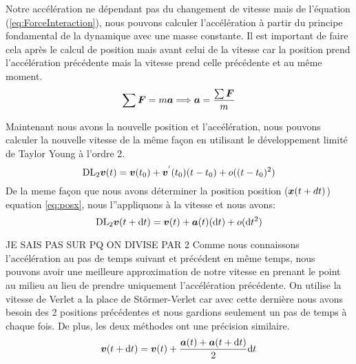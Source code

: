         Notre accélération ne dépendant pas du changement de vitesse mais de l'équation (\ref{eq:ForceInteraction}), nous pouvons calculer l'accélération à partir du principe fondamental de la dynamique avec une masse constante. Il est important de faire cela après le calcul de position mais avant celui de la vitesse car la position prend l'accélération précédente mais la vitesse prend celle précédente et au même moment.
        \begin{equation}
            \label{PFD}
            \sum  \vb*{F} = m\vb*{a} \Longrightarrow \vb*{a} = \frac{\sum \vb*{F}}{m}
        \end{equation}

        Maintenant nous avons la nouvelle position et l'accélération, nous pouvons calculer la nouvelle vitesse de la même façon en utilisant le développement limité de Taylor Young à l'ordre 2.%
        \begin{equation}
            \mathrm{DL}_2\vb*{v}(t) = \vb*{v}(t_0) + \vb*{v}^{'}(t_0)(t-t_0) + o((t-t_0)^2)
        \end{equation}
        De la meme façon que nous avons déterminer la position position ($\vb*{x}(t+dt)$) equation \ref{eq:posx}, nous l''appliquons à la vitesse et nous avons:
        \begin{equation}
            \mathrm{DL}_2\vb*{v}(t+\mathrm{d}t) = \vb*{v}(t) + \vb*{a}(t)(\mathrm{d}t) + o(\mathrm{d}t^2)
        \end{equation}

        JE SAIS PAS SUR PQ ON DIVISE PAR 2
        Comme nous connaissons l'accélération au pas de temps suivant et précédent en même temps, nous pouvons avoir une meilleure approximation de notre vitesse en prenant le point au milieu au lieu de prendre uniquement l'accélération précédente. On utilise la vitesse de Verlet a la place de Störmer-Verlet car avec cette dernière nous avons besoin des 2 positions précédentes et nous gardions seulement un pas de temps à chaque fois. De plus, les deux méthodes ont une précision similaire.
        \begin{equation}
            \label{eq:verletVitesse}
            \vb*{v}(t+\mathrm{d}t) = \vb*{v}(t)+\frac{\vb*{a}(t)+\vb*{a}(t+\mathrm{d}t)}{2}\mathrm{d}t 
        \end{equation}

